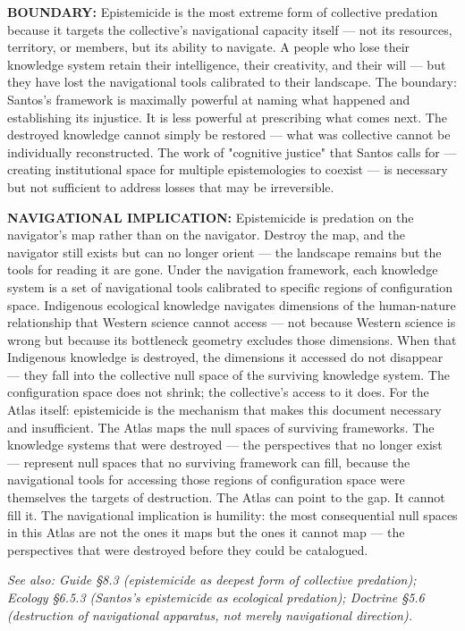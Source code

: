 \textbf{BOUNDARY:} Epistemicide is the most extreme form of collective predation because it targets the collective's navigational capacity itself — not its resources, territory, or members, but its ability to navigate. A people who lose their knowledge system retain their intelligence, their creativity, and their will — but they have lost the navigational tools calibrated to their landscape. The boundary: Santos's framework is maximally powerful at naming what happened and establishing its injustice. It is less powerful at prescribing what comes next. The destroyed knowledge cannot simply be restored — what was collective cannot be individually reconstructed. The work of "cognitive justice" that Santos calls for — creating institutional space for multiple epistemologies to coexist — is necessary but not sufficient to address losses that may be irreversible.


\textbf{NAVIGATIONAL IMPLICATION:} Epistemicide is predation on the navigator's map rather than on the navigator. Destroy the map, and the navigator still exists but can no longer orient — the landscape remains but the tools for reading it are gone. Under the navigation framework, each knowledge system is a set of navigational tools calibrated to specific regions of configuration space. Indigenous ecological knowledge navigates dimensions of the human-nature relationship that Western science cannot access — not because Western science is wrong but because its bottleneck geometry excludes those dimensions. When that Indigenous knowledge is destroyed, the dimensions it accessed do not disappear — they fall into the collective null space of the surviving knowledge system. The configuration space does not shrink; the collective's access to it does. For the Atlas itself: epistemicide is the mechanism that makes this document necessary and insufficient. The Atlas maps the null spaces of surviving frameworks. The knowledge systems that were destroyed — the perspectives that no longer exist — represent null spaces that no surviving framework can fill, because the navigational tools for accessing those regions of configuration space were themselves the targets of destruction. The Atlas can point to the gap. It cannot fill it. The navigational implication is humility: the most consequential null spaces in this Atlas are not the ones it maps but the ones it cannot map — the perspectives that were destroyed before they could be catalogued.


\textit{See also: Guide §8.3 (epistemicide as deepest form of collective predation); Ecology §6.5.3 (Santos's epistemicide as ecological predation); Doctrine §5.6 (destruction of navigational apparatus, not merely navigational direction).}



